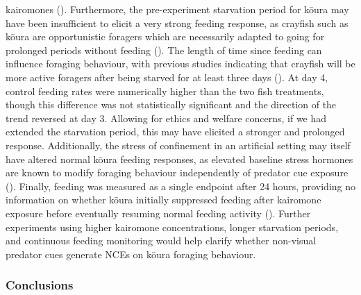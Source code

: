 \documentclass[
  letterpaper,
  DIV=11,
  numbers=noendperiod]{scrartcl}
\begin{document}
kairomones ().
Furthermore, the pre-experiment starvation period for kōura may have
been insufficient to elicit a very strong feeding response, as crayfish
such as kōura are opportunistic foragers which are necessarily adapted
to going for prolonged periods without feeding
(). The length of time since
feeding can influence foraging behaviour, with previous studies
indicating that crayfish will be more active foragers after being
starved for at least three days (). At day 4, control feeding rates were numerically higher than the
two fish treatments, though this difference was not statistically
significant and the direction of the trend reversed at day 3. Allowing
for ethics and welfare concerns, if we had extended the starvation
period, this may have elicited a stronger and prolonged response.
Additionally, the stress of confinement in an artificial setting may
itself have altered normal kōura feeding responses, as elevated baseline
stress hormones are known to modify foraging behaviour independently of
predator cue exposure ().
Finally, feeding was measured as a single endpoint after 24 hours,
providing no information on whether kōura initially suppressed feeding
after kairomone exposure before eventually resuming normal feeding
activity (). Further
experiments using higher kairomone concentrations, longer starvation
periods, and continuous feeding monitoring would help clarify whether
non-visual predator cues generate NCEs on kōura foraging behaviour.

\subsubsection{Conclusions}\label{conclusions}
\end{document}
